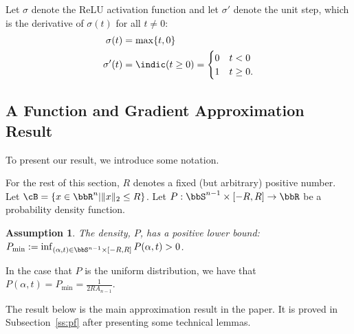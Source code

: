 \documentclass[letterpaper, 10 pt, conference]{ieeeconf}  %
\newtheorem{assumption}{Assumption}
\begin{document}

  

Let $\sigma$ denote the ReLU activation function and let $\sigma'$ denote the unit step, which is the derivative of $\sigma(t)$ for all $t\ne 0$:
\begin{align*}
  \sigma(t)&=\max\{t,0\}\\
  \sigma'(t)&=\indic(t\ge 0)=\begin{cases}
    0 & t < 0 \\
    1 & t\ge 0.
  \end{cases}
\end{align*}

\subsection{A Function and Gradient Approximation Result}

To present our result, we introduce some notation.

For the rest of this section, $R$ denotes a fixed (but arbitrary) positive number.
%
Let $\cB=\{x\in\bbR^n|\|x\|_2\le R\}$.
%
Let $P:\bbS^{n-1}\times [-R,R]\to \bbR$ be a probability density function.
%
\begin{assumption}
  \label{as:positive}
The density, $P$, has a positive lower bound: $P_{\min}:=\inf_{(\alpha,t)\in\bbS^{n-1}\times[-R,R]}P(\alpha,t)>0$.
\end{assumption}

In the case that $P$ is the uniform distribution, we have that $P(\alpha,t)=P_{\min}=\frac{1}{2R A_{n-1}}$. 



The result below is the main approximation result in the paper.
It is proved in Subsection~\ref{ss:pf} after presenting some technical lemmas.
\end{document}
